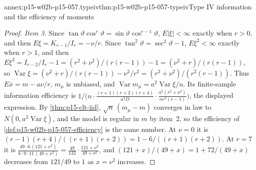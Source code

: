 \begin{annexitem}{annex:p15-w02b-p15-057.typeiv}{thm:p15-w02b-p15-057-typeiv}{Type IV information and the efficiency of moments}
\begin{proof}
\emph{Item 3.} Since \(\tan\vartheta\cos^r\vartheta=\sin\vartheta
\cos^{r-1}\vartheta\), \(E|\xi|<\infty\) exactly when \(r>0\), and then
\(E\xi=K_{r-1}/I_r=-\nu/r\). Since
\(\tan^2\vartheta=\sec^2\vartheta-1\), \(E\xi^2<\infty\) exactly when
\(r>1\), and then \(E\xi^2=I_{r-2}/I_r-1=(r^2+\nu^2)/(r(r-1))-1
=(\nu^2+r)/(r(r-1))\), so
\(\operatorname{Var}\xi=(\nu^2+r)/(r(r-1))-\nu^2/r^2=(r^2+\nu^2)/(r^2(r-1))\).
Thus \(E\overline x=m-a\nu/r\), \(m_\mu\) is unbiased, and
\(\operatorname{Var}m_\mu=a^2\operatorname{Var}\xi/n\). Its finite-sample
information efficiency is
\(1/\bigl(n\cdot\frac{(r+1)(r+2)(r+4)}{a^2D}\cdot\frac{a^2(r^2+\nu^2)}
{nr^2(r-1)}\bigr)\), the displayed expression. By
\cref{thm:p15-clt-iid}, \(\sqrt n\,(m_\mu-m)\) converges in law to
\(N(0,a^2\operatorname{Var}\xi)\), and the model is regular in \(m\) by
item~2, so the efficiency of
\cref{def:p15-w02b-p15-057-efficiency} is the same number. At \(\nu=0\) it
is \((r-1)(r+4)/((r+1)(r+2))=1-6/((r+1)(r+2))\). At \(r=7\) it is
\(\frac{49\cdot6\,(121+\nu^2)}{8\cdot9\cdot11\,(49+\nu^2)}
=\frac{49}{132}\cdot\frac{121+\nu^2}{49+\nu^2}\), and
\((121+x)/(49+x)=1+72/(49+x)\) decreases from \(121/49\) to \(1\) as
\(x=\nu^2\) increases.


\end{proof}
\end{annexitem}
